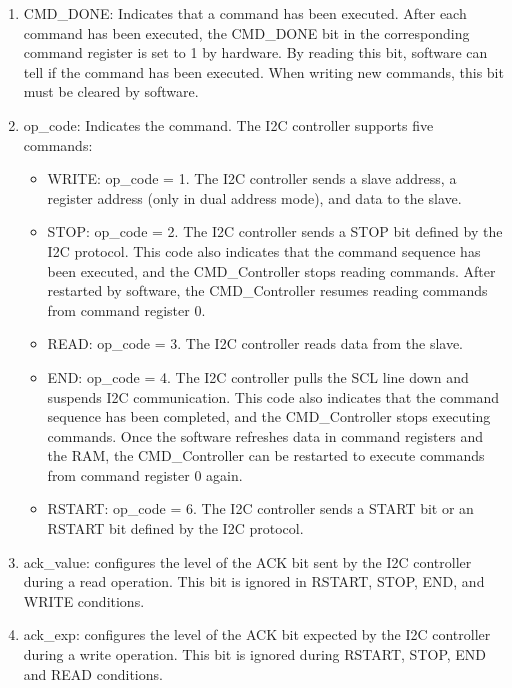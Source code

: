 \documentclass[main\_\_EN.tex]{subfiles}
\begin{document}
\begin{enumerate}

\item CMD\_DONE: Indicates that a command has been executed. After each command has been executed, the CMD\_DONE bit in the corresponding command register is set to 1 by hardware. By reading this bit, software can tell if the command has been executed. When writing new commands, this bit must be cleared by software.

\item op\_code: Indicates the command. The I2C controller supports five commands:

\begin{itemize}

    \item WRITE: op\_code = 1. The I2C controller sends a slave address, a register address  (only in dual address mode), and data to the slave.
    
    \item STOP: op\_code = 2. The I2C controller sends a STOP bit defined by the I2C protocol. This code also indicates that the command sequence has been executed, and the CMD\_Controller stops reading commands. After restarted by software, the CMD\_Controller resumes reading commands from command register 0.
    
    \item READ: op\_code = 3. The I2C controller reads data from the slave.
    
    \item END: op\_code = 4. The I2C controller pulls the SCL line down and suspends I2C communication. This code also indicates that the command sequence has been completed, and the CMD\_Controller stops executing commands. Once the software refreshes data in command registers and the RAM, the CMD\_Controller can be restarted to execute commands from command register 0 again. 

    \item RSTART: op\_code = 6. The I2C controller sends a START bit or an RSTART bit defined by the I2C protocol.

\end{itemize}

\item ack\_value: configures the level of the ACK bit sent by the I2C controller during a read operation. This bit is ignored in RSTART, STOP, END, and WRITE conditions.

\item ack\_exp: configures the level of the ACK bit expected by the I2C controller during a write operation. This bit is ignored during RSTART, STOP, END and READ conditions.


\end{enumerate}
\end{document}
